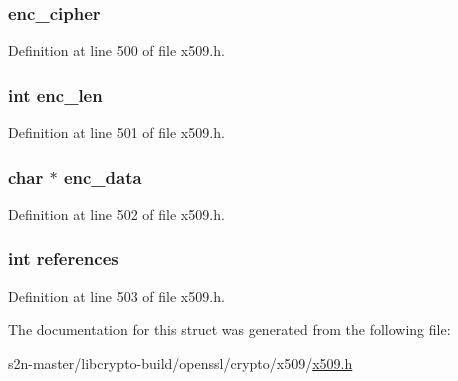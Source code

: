 \subsubsection[{\texorpdfstring{enc\+\_\+cipher}{enc_cipher}}]{ enc\+\_\+cipher}\hypertarget{struct_x509__info__st_a957583bb1c3c2a11ce8cb06200355a4e}{}\label{struct_x509__info__st_a957583bb1c3c2a11ce8cb06200355a4e}


Definition at line 500 of file x509.\+h.

\subsubsection[{\texorpdfstring{enc\+\_\+len}{enc_len}}]{\setlength{\rightskip}{0pt plus 5cm}int enc\+\_\+len}\hypertarget{struct_x509__info__st_a1b09320c90f77486e88b79923ba61f6b}{}\label{struct_x509__info__st_a1b09320c90f77486e88b79923ba61f6b}


Definition at line 501 of file x509.\+h.

\subsubsection[{\texorpdfstring{enc\+\_\+data}{enc_data}}]{\setlength{\rightskip}{0pt plus 5cm}char $\ast$ enc\+\_\+data}\hypertarget{struct_x509__info__st_a23d82bad660e30414bf67db94fe0eb2d}{}\label{struct_x509__info__st_a23d82bad660e30414bf67db94fe0eb2d}


Definition at line 502 of file x509.\+h.

\subsubsection[{\texorpdfstring{references}{references}}]{\setlength{\rightskip}{0pt plus 5cm}int references}\hypertarget{struct_x509__info__st_a146fdb34d9a909e530adf8b189481195}{}\label{struct_x509__info__st_a146fdb34d9a909e530adf8b189481195}


Definition at line 503 of file x509.\+h.



The documentation for this struct was generated from the following file\+:\begin{DoxyCompactItemize}
\item 
s2n-\/master/libcrypto-\/build/openssl/crypto/x509/\hyperlink{crypto_2x509_2x509_8h}{x509.\+h}\end{DoxyCompactItemize}
